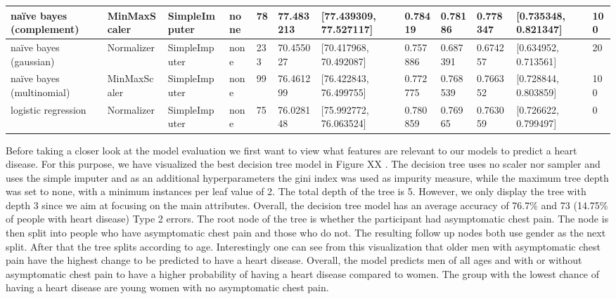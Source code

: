 \begin{table}[]
\begin{tabular}{|l|l|l|l|l|l|l|l|l|l|l|l|}
naïve bayes (complement)           & MinMaxScaler     & SimpleImputer    & none               & 78              & 77.483213         & {[}77.439309, 77.527117{]}   & 0.78419            & 0.78186         & 0.778347         & {[}0.735348, 0.821347{]}     & 100                                                  \\ \hline
naïve bayes (gaussian)             & Normalizer       & SimpleImputer    & none               & 233             & 70.455027         & {[}70.417968, 70.492087{]}   & 0.757886           & 0.687391        & 0.674257         & {[}0.634952, 0.713561{]}     & 20                                                   \\ \hline
naïve bayes (multinomial)          & MinMaxScaler     & SimpleImputer    & none               & 99              & 76.461299         & {[}76.422843, 76.499755{]}   & 0.772775           & 0.768539        & 0.766352         & {[}0.728844, 0.803859{]}     & 100                                                  \\ \hline
logistic regression                & Normalizer       & SimpleImputer    & none               & 75              & 76.028148         & {[}75.992772, 76.063524{]}   & 0.780859           & 0.76965         & 0.763059         & {[}0.726622, 0.799497{]}     & 0                                                    \\ \hline
\end{tabular}
\end{table}



Before taking a closer look at the model evaluation we first want to view what features are relevant to our models to predict a heart disease. For this purpose, we have visualized the best decision tree model in Figure XX . The decision tree uses no scaler nor sampler and uses the simple imputer and as an additional hyperparameters the gini index was used as impurity measure, while the maximum tree depth was set to none, with a minimum instances per leaf value of 2. The total depth of the tree is 5. However, we only display the tree with depth 3 since we aim at focusing on the main attributes. Overall, the decision tree model has an average accuracy of 76.7\% and 73 (14.75\% of people with heart disease) Type 2 errors. The root node of the tree is whether the participant had asymptomatic chest pain. The node is then split into people who have asymptomatic chest pain and those who do not. The resulting follow up nodes both use gender as the next split. After that the tree splits according to age. Interestingly one can see from this visualization that older men with asymptomatic chest pain have the highest change to be predicted to have a heart disease. Overall, the model predicts men of all ages and with or without asymptomatic chest pain to have a higher probability of having a heart disease compared to women. The group with the lowest chance of having a heart disease are young women with no asymptomatic chest pain. 

